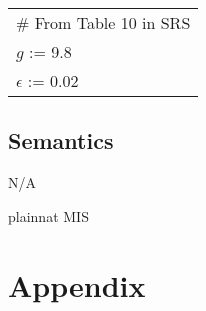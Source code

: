 \documentclass[12pt, titlepage]{article}
\begin{document}
\renewcommand{\arraystretch}{1.2}
\begin{longtable*}[l]{l} 
\# From Table 10 in SRS\\
  $g$ := 9.8\\
  $\epsilon$ := 0.02\\
\end{longtable*}

\subsection{Semantics}

N/A

\newpage

 {plainnat}
 {MIS}

\newpage

\section{Appendix} \label{Appendix}

\renewcommand{\arraystretch}{1.2}
\end{document}
